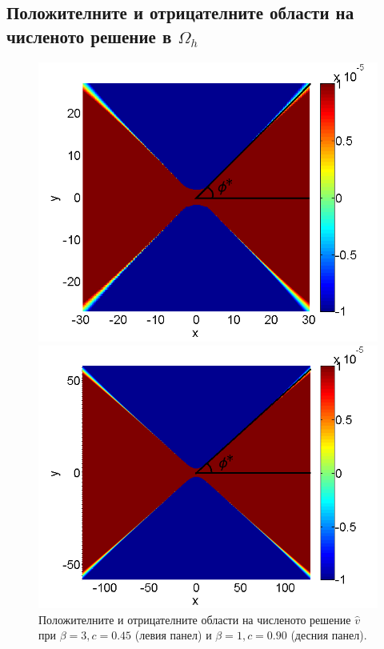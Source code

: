 \documentclass{article}
\begin{document}
\subsection{Положителните и отрицателните области на численото решение в $\Omega_h$ }
\begin{figure}[ht]
	\begin{minipage}[b]{0.46\linewidth}
		\raggedleft
		\includegraphics[width=\linewidth]{NewBoundaryCondition/PosNeg_bt3_c045.png}
	\end{minipage}	
	\begin{minipage}[b]{0.49\linewidth}
		\raggedright
		 \includegraphics[width=\linewidth]{NewBoundaryCondition/PosNeg_bt1_c090.png}
	\end{minipage}
	\caption{Положителните и отрицателните области на численото решение $\widehat v$ при $\beta = 3, c=0.45$ (левия панел) и $\beta = 1, c=0.90$ (десния панел). }
	\label{fig:posNegDom}
\end{figure}
\end{document}
